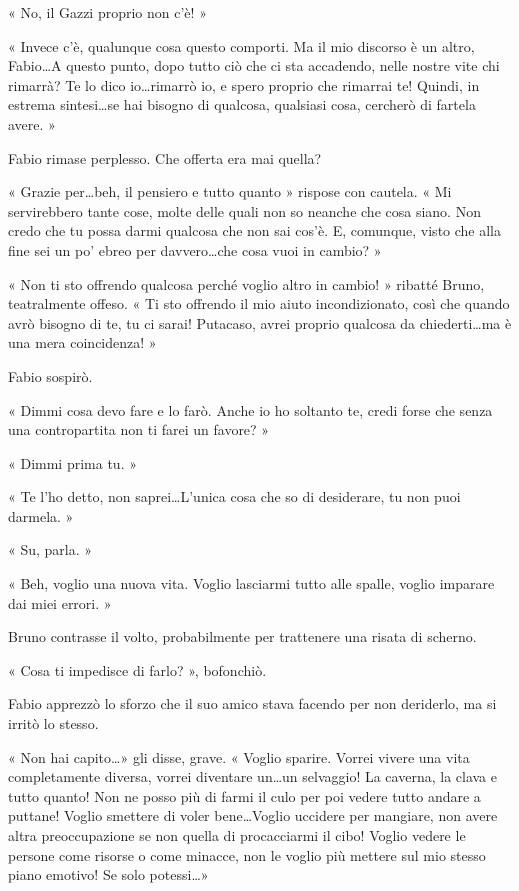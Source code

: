  « No, il Gazzi proprio non c'è!  »

« Invece c'è, qualunque cosa questo comporti. Ma il mio discorso è un altro, Fabio\ldots A questo punto, dopo tutto ciò che ci sta accadendo, nelle nostre vite chi rimarrà? Te lo dico io\ldots rimarrò io, e spero proprio che rimarrai te! Quindi, in estrema sintesi\ldots se hai bisogno di qualcosa, qualsiasi cosa, cercherò di fartela avere. »

Fabio rimase perplesso. Che offerta era mai quella?

« Grazie per\ldots beh, il pensiero e tutto quanto » rispose con cautela. « Mi servirebbero tante cose, molte delle quali non so neanche che cosa siano. Non credo che tu possa darmi qualcosa che non sai cos'è. E, comunque, visto che alla fine sei un po' ebreo per davvero\ldots che cosa vuoi in cambio? »

« Non ti sto offrendo qualcosa perché voglio altro in cambio! » ribatté Bruno, teatralmente offeso. « Ti sto offrendo il mio aiuto incondizionato, così che quando avrò bisogno di te, tu ci sarai! Putacaso, avrei proprio qualcosa da chiederti\ldots ma è una mera coincidenza! »

Fabio sospirò.

« Dimmi cosa devo fare e lo farò. Anche io ho soltanto te, credi forse che senza una contropartita non ti farei un favore? »

« Dimmi prima tu. »

« Te l'ho detto, non saprei\ldots L'unica cosa che so di desiderare, tu non puoi darmela. »

« Su, parla. »

« Beh, voglio una nuova vita. Voglio lasciarmi tutto alle spalle, voglio imparare dai miei errori. »

Bruno contrasse il volto, probabilmente per trattenere una risata di scherno.

« Cosa ti impedisce di farlo? », bofonchiò.

Fabio apprezzò lo sforzo che il suo amico stava facendo per non deriderlo, ma si irritò lo stesso.

« Non hai capito\ldots » gli disse, grave. « Voglio sparire. Vorrei vivere una vita completamente diversa, vorrei diventare un\ldots un selvaggio! La caverna, la clava e tutto quanto! Non ne posso più di farmi il culo per poi vedere tutto andare a puttane! Voglio smettere di voler bene\ldots Voglio uccidere per mangiare, non avere altra preoccupazione se non quella di procacciarmi il cibo! Voglio vedere le persone come risorse o come minacce, non le voglio più mettere sul mio stesso piano emotivo! Se solo potessi\ldots »

